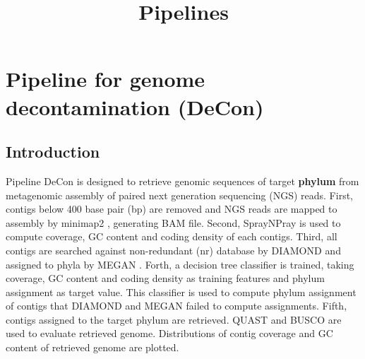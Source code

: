\documentclass[11pt]{article}
\title{Pipelines}
\author{}
\date{}
\begin{document}
\begin{sloppypar}
  \maketitle

  \linenumbers
\section{Pipeline for genome decontamination (DeCon)}
\subsection{Introduction}
Pipeline DeCon is designed to retrieve genomic sequences of target \textbf{phylum} from metagenomic assembly of paired next generation sequencing (NGS) reads. 
First, contigs below 400 base pair (bp) are removed and NGS reads are mapped to assembly by minimap2 \parencite{li2018minimap2}, generating BAM file. 
Second, SprayNPray \parencite{garber2022spraynpray} is used to compute coverage, GC content and coding density of each contigs. 
Third, all contigs are searched against non-redundant (nr) database by DIAMOND \parencite{buchfink2015fast} and assigned to phyla by MEGAN \parencite{huson2007megan}. 
Forth, a decision tree classifier is trained, taking coverage, GC content and coding density as training features and phylum assignment as target value. 
This classifier is used to compute phylum assignment of contigs that DIAMOND and MEGAN failed to compute assignments. 
Fifth, contigs assigned to the target phylum are retrieved. 
QUAST \parencite{gurevich2013quast} and BUSCO \parencite{simao2015busco} are used to evaluate retrieved genome. 
Distributions of contig coverage and GC content of retrieved genome are plotted. 

\end{sloppypar}
\end{document}
